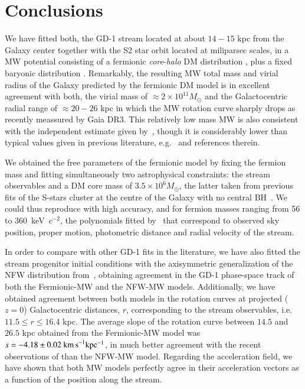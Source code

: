 \documentclass[twocolumn]{aa}
\begin{document}
\section{Conclusions}
\label{sec:conclusions}
We have fitted both, the GD-1 stream located at about $14-15$ kpc from the Galaxy center together with the S2 star orbit located at miliparsec scales, in a MW potential consisting of a fermionic \textit{core}-\textit{halo} DM distribution \citep{arguelles_novel_2018,2020A&A...641A..34B,2021MNRAS.505L..64B,2022MNRAS.511L..35A}, plus a fixed baryonic distribution \citep{2017A&A...598A..66P}. Remarkably, the resulting MW total mass and virial radius of the Galaxy predicted by the fermionic DM model is in excellent agreement with both, the virial mass of $\approx 2\times 10^{11} M_\odot$ and the Galactocentric radial range of $\approx 20-26$ kpc in which the MW rotation curve sharply drops as recently meassured by Gaia DR3. This relatively low mass MW is also consistent with the independent estimate given by~\cite{2014MNRAS.445.3788G}, though it is considerably lower than typical values given in previous literature, e.g.~\cite{2010MNRAS.406..264W} and references therein.

We obtained the free parameters of the fermionic model by fixing the fermion mass and fitting simultaneously two astrophysical constraints: the stream observables and a
DM core mass of $3.5\times10^6M_\odot$, the latter taken from previous fits of the S-stars cluster at
the centre of the Galaxy with no central BH~\citep{2020A&A...641A..34B,2021MNRAS.505L..64B}. We could thus reproduce with high accuracy, and for fermion masses ranging from 56 to 360~keV~$c^{-2}$, the polynomials fitted by~\citet{Ibata_2020} that correspond to observed sky position, proper motion, photometric distance and radial velocity of the stream. 

In order to compare with other GD-1 fits in the literature, we have also fitted the stream progenitor initial conditions with the  axisymmetric generalization of the NFW distribution from~\citet{2019MNRAS.486.2995M}, obtaining agreement in the GD-1 phase-space track of
both the Fermionic-MW and the NFW-MW models. Additionally, we have obtained agreement between both models in the rotation curves at projected ($z=0$) Galactocentric distances, $r$, corresponding to the stream observables, i.e. $11.5\leq r \leq 16.4$ kpc. The average slope of the rotation curve between $14.5$ and $26.5$ kpc obtained from the Fermionic-MW model was $s=-4.18 \pm 0.02~\rm{km\, s}^{-1} kpc^{-1}$, in much better agreement with the recent observations of \cite{Jiao2023} than the NFW-MW model. Regarding the acceleration field, we have shown that both MW models perfectly agree in their acceleration vectors as a function of the position along the stream.
\end{document}
